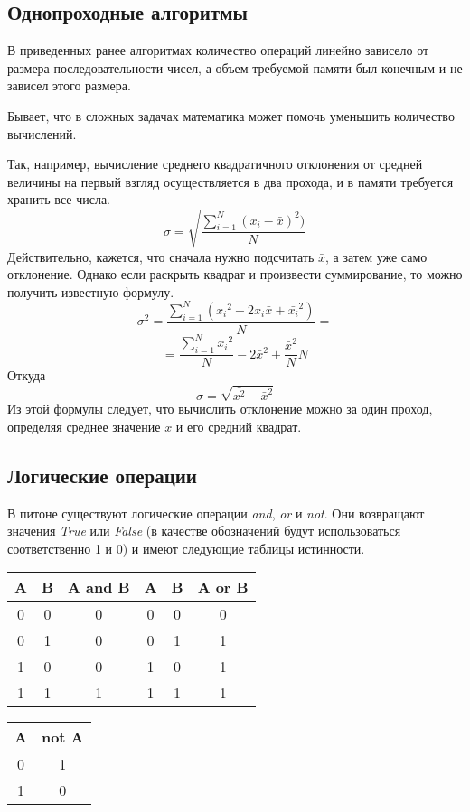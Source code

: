 \documentclass[a4paper, fleqn]{article}
\begin{document}
	\subsection*{Однопроходные алгоритмы}
	
	В приведенных ранее алгоритмах количество операций линейно зависело от размера последовательности чисел, а объем требуемой памяти был конечным и не зависел этого размера. 
	
	Бывает, что в сложных задачах математика может помочь уменьшить количество вычислений. 
	
	Так, например, вычисление среднего квадратичного отклонения от средней величины на первый взгляд осуществляется в два прохода, и в памяти требуется хранить все числа.
	\[\sigma = \sqrt{\dfrac{\sum_{i=1}^{N}(x_i - \bar{x})^2)}{N}}\]
	Действительно, кажется, что сначала нужно подсчитать $\bar{x}$, а затем уже само отклонение. Однако если раскрыть квадрат и произвести суммирование, то можно получить известную формулу.
	\[\sigma^2 = \dfrac{\sum_{i=1}^{N}({x_i}^2 - 2x_i\bar{x} + \bar{x_i}^2)}{N}=\]
	\[=\dfrac{\sum_{i=1}^{N}{x_i}^2}{N} - 2\bar{x}^2 + \dfrac{\bar{x}^2}{N}N\]
	Откуда
	\[\sigma = \sqrt{\bar{x^2} - \bar{x}^2}\]
	Из этой формулы следует, что вычислить отклонение можно за один проход, определяя среднее значение $x$ и его средний квадрат. 
	
	\subsection*{Логические операции}
	
	В питоне существуют логические операции \emph{and}, \emph{or} и \emph{not}. Они возвращают значения \emph{True} или \emph{False} (в качестве обозначений будут использоваться соответственно 1 и 0) и имеют следующие таблицы истинности.
	
	\begin{tabular}{cc|c|cc|c}
		A&  B&  A and B&  A&  B&  A or B\\ 
		\hline
		0&  0&  0&  0&  0&  0\\ 
		0&  1&  0&  0&  1&  1\\ 
		1&  0&  0&  1&  0&  1\\ 
		1&  1&  1&  1&  1&  1\\ 
	\end{tabular} 
	\begin{tabular}{c|c}
		A&  not A\\ 
		\hline  
		0&  1\\ 
		1&  0\\  
	\end{tabular} 
\end{document}

